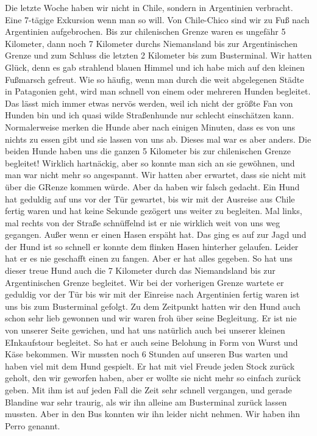 \documentclass[11pt]{book}
\begin{document}
Die letzte Woche haben wir nicht in Chile, sondern in Argentinien verbracht. Eine 7-tägige Exkursion wenn man so will. 
Von Chile-Chico sind wir zu Fuß nach Argentinien aufgebrochen. Bis zur chilenischen Grenze waren es ungefähr 5 Kilometer, 
dann noch 7 Kilometer durchs Niemansland bis zur Argentinischen Grenze und zum Schluss die letzten 2 Kilometer bis zum Busterminal. 
Wir hatten Glück, denn es gab strahlend blauen Himmel und ich habe mich auf den kleinen Fußmarsch gefreut. Wie so häufig, 
wenn man durch die weit abgelegenen Städte in Patagonien geht, wird man schnell von einem oder mehreren Hunden begleitet. Das 
lässt mich immer etwas nervös werden, weil ich nicht der größte Fan von Hunden bin und ich quasi wilde Straßenhunde nur schlecht 
einschätzen kann. Normalerweise merken die Hunde aber nach einigen Minuten, dass es von uns nichts zu essen gibt und sie lassen 
von uns ab. Dieses mal war es aber anders. Die beiden Hunde haben uns die ganzen 5 Kilometer bis zur chilenischen Grenze begleitet!
Wirklich hartnäckig, aber so konnte man sich an sie gewöhnen, und man war nicht mehr so angespannt. Wir hatten aber erwartet, dass 
sie nicht mit über die GRenze kommen würde. Aber da haben wir falsch gedacht. Ein Hund hat geduldig auf uns vor der Tür gewartet, 
bis wir mit der Ausreise aus Chile fertig waren und hat keine Sekunde gezögert uns weiter zu begleiten. Mal links, mal rechts von 
der Straße schnüffelnd ist er nie wirklich weit von uns weg gegangen. Außer wenn er einen Hasen erspäht hat. Das ging es auf zur 
Jagd und der Hund ist so schnell er konnte dem flinken Hasen hinterher gelaufen. Leider hat er es nie geschafft einen zu fangen. 
Aber er hat alles gegeben. So hat uns dieser treue Hund auch die 7 Kilometer durch das Niemandsland bis zur Argentinischen Grenze 
begleitet. Wir bei der vorherigen Grenze wartete er geduldig vor der Tür bis wir mit der Einreise nach Argentinien fertig waren 
ist uns bis zum Busterminal gefolgt. Zu dem Zeitpunkt hatten wir den Hund auch schon sehr lieb gewonnen und wir waren froh über 
seine Begleitung. Er ist nie von unserer Seite gewichen, und hat uns natürlich auch bei unserer kleinen EInkaufstour begleitet. 
So hat er auch seine Belohung in Form von Wurst und Käse bekommen. Wir mussten noch 6 Stunden auf unseren Bus warten und haben 
viel mit dem Hund gespielt. Er hat mit viel Freude jeden Stock zurück geholt, den wir geworfen haben, aber er wollte sie nicht 
mehr so einfach zurück geben. Mit ihm ist auf jeden Fall die Zeit sehr schnell vergangen, und gerade Blandine war sehr traurig, 
als wir ihn alleine am Busterminal zurück lassen mussten. Aber in den Bus konnten wir ihn leider nicht nehmen. Wir haben ihn Perro genannt.
\end{document}
